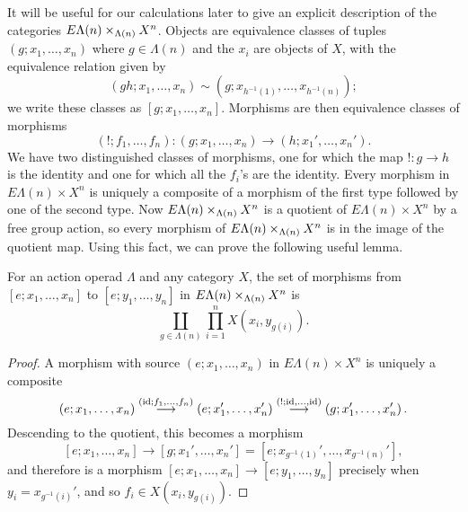 



It will be useful for our calculations later to give an explicit description of the categories $E\Lambda(n) \times_{\Lambda(n)} X^{n}$. Objects are equivalence classes of tuples $(g; x_1, \ldots, x_n)$ where $g \in \Lambda(n)$ and the $x_{i}$ are objects of $X$, with the equivalence relation given by
  \[
    (gh; x_1, \ldots, x_n) \sim \left(g; x_{h^{-1}(1)}, \ldots, x_{h^{-1}(n)}\right);
  \]
  we write these classes as $[g; x_1, \ldots, x_n]$. Morphisms are then equivalence classes of morphisms
  \[
    (!; f_1, \ldots, f_n) \colon  (g; x_1, \ldots, x_n) \rightarrow \left(h; x_1', \ldots, x_n'\right).
  \]
We have two distinguished classes of morphisms, one for which the map $! \colon  g \rightarrow h$ is the identity and one for which all the $f_{i}$'s are the identity. Every morphism in $E\Lambda(n) \times X^{n}$ is uniquely a composite of a  morphism of the first type followed by one of the second type. Now $E\Lambda(n) \times_{\Lambda(n)} X^{n}$ is a quotient of $E\Lambda(n) \times X^{n}$ by a free group action, so every morphism of $E\Lambda(n) \times_{\Lambda(n)} X^{n}$ is in the image of the quotient map. Using this fact, we can prove the following useful lemma.

\begin{lem}\label{hom-set-lemma}
For an action operad $\Lambda$ and any category $X$, the set of morphisms from $[e; x_1, \ldots, x_n]$ to $[e; y_1, \ldots, y_n]$ in $E\Lambda(n) \times_{\Lambda(n)} X^{n}$ is
  \[
    \coprod_{g \in \Lambda(n)} \prod_{i=1}^{n} X\left(x_i, y_{g(i)}\right).
  \]
\end{lem}
\begin{proof}
A morphism with source $(e; x_1, \ldots, x_n)$ in $E\Lambda(n) \times X^{n}$ is uniquely a composite
  \[
    (e; x_1, \ldots, x_n) \stackrel{(\textrm{id}; f_{1}, \ldots, f_{n})}{\longrightarrow} \left(e; x_1', \ldots, x_n'\right) \stackrel{(!; \textrm{id}, \ldots, \textrm{id})}{\longrightarrow} \left(g; x_1', \ldots, x_n'\right).
  \]
Descending to the quotient, this becomes a morphism
  \[
    [e; x_1, \ldots, x_n] \rightarrow \left[g; x_1', \ldots, x_n'\right] = \left[e; x_{g^{-1}(1)}', \ldots, x_{g^{-1}(n)}'\right],
  \]
and therefore is a morphism $[e; x_1, \ldots, x_n] \rightarrow [e; y_1, \ldots, y_n]$ precisely when $y_i = x_{g^{-1}(i)}'$, and so $f_i \in   X(x_i, y_{g(i)})$.
\end{proof}




